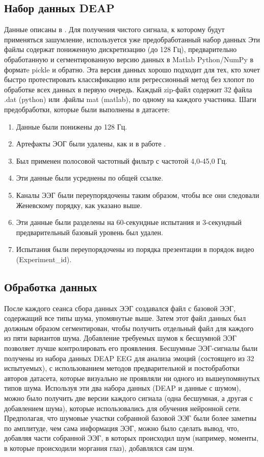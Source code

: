 \documentclass[12pt, a4paper, titlepage]{extreport}
\begin{document}
	\subsection*{Набор данных DEAP}
	Данные описаны в \cite{34}. Для получения чистого сигнала, к которому будут применяться зашумление, используется уже предобработанный набор данных Эти файлы содержат пониженную дискретизацию (до 128 Гц), предварительно обработанную и сегментированную версию данных в Matlab Python/NumPy в форматe pickle и обратно. Эта версия данных хорошо подходит для тех, кто хочет быстро протестировать классификацию или регрессионный метод без хлопот по обработке всех данных в первую очередь. Каждый zip-файл содержит 32 файла .dat (python) или .файлы mat (matlab), по одному на каждого участника.
	Шаги предобработки, которые были выполнены в датасете:
	\begin{enumerate}
		\item Данные были понижены до 128 Гц.
		\item Артефакты ЭОГ были удалены, как и в работе \cite{34}.
		\item Был применен полосовой частотный фильтр с частотой 4,0-45,0 Гц.
		\item Эти данные были усреднены по общей ссылке.
		\item Каналы ЭЭГ были переупорядочены таким образом, чтобы все они следовали Женевскому порядку, как указано выше.
		\item Эти данные были разделены на 60-секундные испытания и 3-секундный предварительный базовый уровень был удален.
		\item Испытания были переупорядочены из порядка презентации в порядок видео (Experiment\_id).
	\end{enumerate}
	\subsection*{Обработка данных}
	После каждого сеанса сбора данных ЭЭГ создавался файл с базовой ЭЭГ, содержащий все типы шума, упомянутые выше. Затем этот файл данных был должным образом сегментирован, чтобы получить отдельный файл для каждого из пяти вариантов шума. Добавление требуемых шумов к бесшумной ЭЭГ позволяет лучше контролировать его проявления. Бесшумные ЭЭГ-сигналы были получены из набора данных DEAP EEG для анализа эмоций (состоящего из 32 испытуемых), с использованием методов предварительной и постобработки авторов датасета, которые визуально не проявляли ни одного из вышеупомянутых типов шума.
	Используя эти два набора данных (DEAP и данные с шумом), можно было получить две версии каждого сигнала (одна бесшумная, а другая с добавлением шума), которые использовались для обучения нейронной сети. Предполагая, что шумовые участки собранной базовой ЭЭГ были более заметны по амплитуде, чем сама информация ЭЭГ, можно было сделать вывод, что, добавляя части собранной ЭЭГ, в которых происходил шум (например, моменты, в которые происходили моргания глаз), добавлялся сам шум.
	
\end{document}
